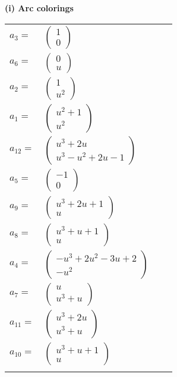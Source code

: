 \documentclass[1p]{elsarticle_modified}
\theoremstyle{definition}
\begin{document}
\flushleft \textbf{(i) Arc colorings}\\
\begin{tabular}{m{7pt} m{180pt} m{7pt} m{180pt} }
\flushright $a_{3}=$&$\begin{pmatrix}1\\0\end{pmatrix}$ \\
\flushright $a_{6}=$&$\begin{pmatrix}0\\u\end{pmatrix}$ \\
\flushright $a_{2}=$&$\begin{pmatrix}1\\u^2\end{pmatrix}$ \\
\flushright $a_{1}=$&$\begin{pmatrix}u^2+1\\u^2\end{pmatrix}$ \\
\flushright $a_{12}=$&$\begin{pmatrix}u^3+2 u\\u^3- u^2+2 u-1\end{pmatrix}$ \\
\flushright $a_{5}=$&$\begin{pmatrix}-1\\0\end{pmatrix}$ \\
\flushright $a_{9}=$&$\begin{pmatrix}u^3+2 u+1\\u\end{pmatrix}$ \\
\flushright $a_{8}=$&$\begin{pmatrix}u^3+u+1\\u\end{pmatrix}$ \\
\flushright $a_{4}=$&$\begin{pmatrix}- u^3+2 u^2-3 u+2\\- u^2\end{pmatrix}$ \\
\flushright $a_{7}=$&$\begin{pmatrix}u\\u^3+u\end{pmatrix}$ \\
\flushright $a_{11}=$&$\begin{pmatrix}u^3+2 u\\u^3+u\end{pmatrix}$ \\
\flushright $a_{10}=$&$\begin{pmatrix}u^3+u+1\\u\end{pmatrix}$\\&\end{tabular}
\end{document}
